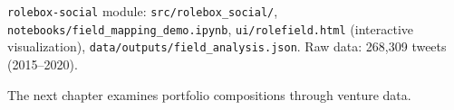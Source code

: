 \documentclass[../main.tex]{subfiles}
\begin{document}
\vspace{0.5em}
\begin{replicationbox}
\texttt{rolebox-social} module: \texttt{src/rolebox\_social/}, \texttt{notebooks/field\_mapping\_demo.ipynb}, \texttt{ui/rolefield.html} (interactive visualization), \texttt{data/outputs/field\_analysis.json}. Raw data: 268,309 tweets (2015--2020).
\end{replicationbox}

\vspace{1em}
The next chapter examines portfolio compositions through venture data.
\end{document}
